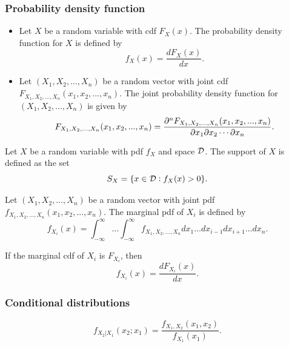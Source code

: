 \begin{refsection}
\subsubsection{Probability density function}


\begin{definition}\hfill
\begin{itemize}
	\item Let $X$ be a random variable with cdf $F_X(x)$. The probability density function for $X$ is defined by
	$$f_{X}(x) = \frac{d F_X(x)}{dx}.$$
	\item Let $(X_1,X_2,...,X_n)$ be a random vector with joint cdf $F_{X_1,X_2,...,X_n}(x_1,x_2,...,x_n)$. The joint probability density function for $(X_1,X_2,...,X_n)$ is given by $$F_{X_1,X_2,...,X_n}(x_1,x_2,...,x_n) = \frac{\partial ^n F_{X_1,X_2,...,X_n}(x_1,x_2,...,x_n)}{\partial x_1 \partial x_2 \cdots \partial x_n }.$$	
\end{itemize}	
\end{definition}


\begin{definition}
	Let $X$ be a random variable with pdf $f_X$ and space $\mathcal{D}$. The support of $X$ is defined as the set
	$$S_X = \{x\in \mathcal{D}: f_X(x) > 0\}.$$
\end{definition}


\begin{definition}
	\item Let $(X_1,X_2,...,X_n)$ be a random vector with joint pdf $f_{X_1,X_2,...,X_n}(x_1,x_2,...,x_n)$. The marginal pdf of $X_i$ is defined by
	$$f_{X_i}(x) = \int_{-\infty}^\infty ...\int_{-\infty}^\infty f_{X_1,X_2,...,X_n} dx_1 ... dx_{i-1}dx_{i+1}...dx_n.$$
	
	If the marginal cdf of $X_i$ is $F_{X_i}$, then
	$$f_{X_i}(x) = \frac{d F_{X_i}(x)}{dx}.$$
\end{definition}





\subsubsection{Conditional distributions }

\begin{definition}\cite[97]{hoggintroduction}
	
	$$f_{X_2|X_1}(x_2;x_1) = \frac{f_{X_1,X_2}(x_1,x_2)}{f_{X_1}(x_1)}.$$
\end{definition}



\end{refsection}
